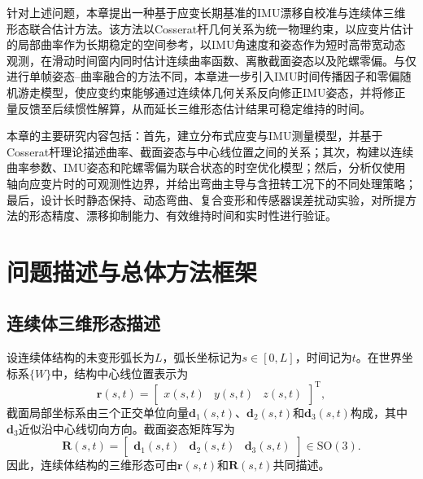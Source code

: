 针对上述问题，本章提出一种基于应变长期基准的IMU漂移自校准与连续体三维形态联合估计方法。该方法以Cosserat杆几何关系为统一物理约束，以应变片估计的局部曲率作为长期稳定的空间参考，以IMU角速度和姿态作为短时高带宽动态观测，在滑动时间窗内同时估计连续曲率函数、离散截面姿态以及陀螺零偏。与仅进行单帧姿态--曲率融合的方法不同，本章进一步引入IMU时间传播因子和零偏随机游走模型，使应变约束能够通过连续体几何关系反向修正IMU姿态，并将修正量反馈至后续惯性解算，从而延长三维形态估计结果可稳定维持的时间。

本章的主要研究内容包括：首先，建立分布式应变与IMU测量模型，并基于Cosserat杆理论描述曲率、截面姿态与中心线位置之间的关系；其次，构建以连续曲率参数、IMU姿态和陀螺零偏为联合状态的时空优化模型；然后，分析仅使用轴向应变片时的可观测性边界，并给出弯曲主导与含扭转工况下的不同处理策略；最后，设计长时静态保持、动态弯曲、复合变形和传感器误差扰动实验，对所提方法的形态精度、漂移抑制能力、有效维持时间和实时性进行验证。

\section{问题描述与总体方法框架}
\label{sec:problem_framework}

\subsection{连续体三维形态描述}

设连续体结构的未变形弧长为$L$，弧长坐标记为$s\in[0,L]$，时间记为$t$。在世界坐标系$\{W\}$中，结构中心线位置表示为
\begin{equation}
    \bm r(s,t)=
    \begin{bmatrix}
        x(s,t) & y(s,t) & z(s,t)
    \end{bmatrix}^{\mathrm T},
\end{equation}
截面局部坐标系由三个正交单位向量$\bm d_1(s,t)$、$\bm d_2(s,t)$和$\bm d_3(s,t)$构成，其中$\bm d_3$近似沿中心线切向方向。截面姿态矩阵写为
\begin{equation}
    \bm R(s,t)=
    \begin{bmatrix}
        \bm d_1(s,t) & \bm d_2(s,t) & \bm d_3(s,t)
    \end{bmatrix}
    \in \mathrm{SO}(3).
\end{equation}
因此，连续体结构的三维形态可由$\bm r(s,t)$和$\bm R(s,t)$共同描述。

